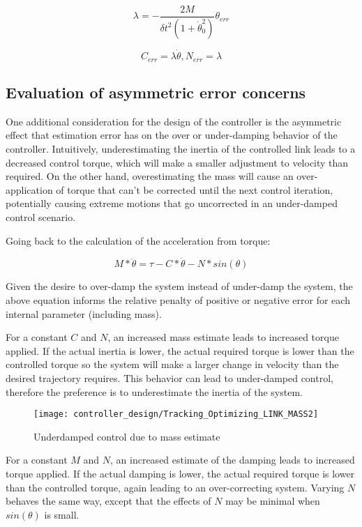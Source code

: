 \begin{equation}
\lambda 
=
- \dfrac{2M}{\delta t^{2} (1 + \dot{\theta}_{0}^{2})} \theta_{err}
\end{equation}

\begin{equation}
C_{err} = \lambda \dot{\theta}, N_{err} = \lambda
\end{equation}

\subsection{Evaluation of asymmetric error concerns}

One additional consideration for the design of the controller is the asymmetric
effect that estimation error has on the over or under-damping behavior of the
controller. Intuitively,
underestimating the inertia of the controlled link leads to a decreased control
torque, which will make a smaller adjustment to velocity than required. On the
other hand, overestimating the mass will cause an over-application of torque
that can't be corrected until the next control iteration, potentially causing
extreme motions that go uncorrected in an under-damped control scenario.

Going back to the calculation of the acceleration from torque:

\begin{equation}
M * \ddot{\theta} = \tau - C * \dot{\theta} - N * sin(\theta)
\end{equation}

Given the desire to over-damp the system instead of under-damp the system, the
above equation informs the relative penalty of positive or negative error for
each internal parameter (including mass).

For a constant $C$ and $N$, an increased mass estimate leads to increased torque
applied. If the actual inertia is lower, the actual required torque is lower 
than the controlled torque so the system will make a larger change in velocity 
than the desired trajectory requires. This behavior can lead to under-damped 
control, therefore the preference is to underestimate the inertia of the system.

\begin{figure}[h!]
\centering
\texttt{[image: controller\_design/Tracking\_Optimizing\_LINK\_MASS2]}
\caption{Underdamped control due to mass estimate}
\label{fig:UnderdampedControl}
\end{figure}


For a constant $M$ and $N$, an increased estimate of the damping leads to 
increased torque applied. If the actual damping is lower, the actual required
torque is lower than the controlled torque, again leading to an over-correcting
system. Varying $N$ behaves the same way, except that the effects of $N$ may be
minimal when $sin(\theta)$ is small.
